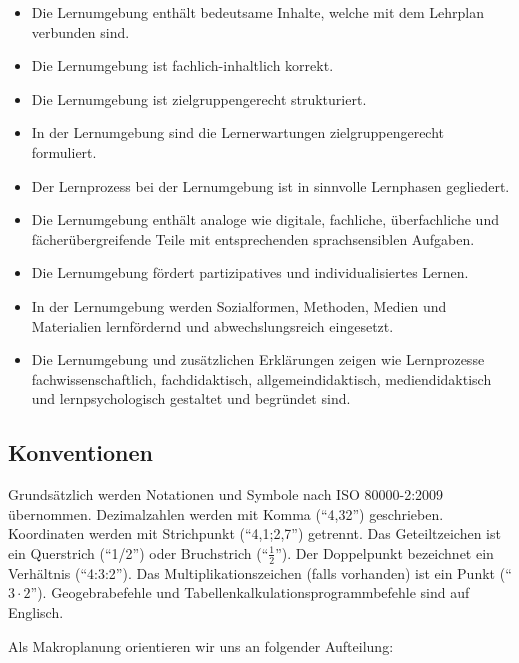 \documentclass[
  10pt,
  a4paper,
  DIV=11,
  oneside]{scrartcl}
\providecommand{\tightlist}{%
  \setlength{\itemsep}{0pt}\setlength{\parskip}{0pt}}\usepackage{longtable,booktabs,array}
\begin{document}
\begin{itemize}
\tightlist
\item
  Die Lernumgebung enthält bedeutsame Inhalte, welche mit dem Lehrplan
  verbunden sind.
\item
  Die Lernumgebung ist fachlich-inhaltlich korrekt.
\item
  Die Lernumgebung ist zielgruppengerecht strukturiert.\\
\item
  In der Lernumgebung sind die Lernerwartungen zielgruppengerecht
  formuliert.
\item
  Der Lernprozess bei der Lernumgebung ist in sinnvolle Lernphasen
  gegliedert.
\item
  Die Lernumgebung enthält analoge wie digitale, fachliche,
  überfachliche und fächerübergreifende Teile mit entsprechenden
  sprachsensiblen Aufgaben.
\item
  Die Lernumgebung fördert partizipatives und individualisiertes Lernen.
\item
  In der Lernumgebung werden Sozialformen, Methoden, Medien und
  Materialien lernfördernd und abwechslungsreich eingesetzt.
\item
  Die Lernumgebung und zusätzlichen Erklärungen zeigen wie Lernprozesse
  fachwissenschaftlich, fachdidaktisch, allgemeindidaktisch,
  mediendidaktisch und lernpsychologisch gestaltet und begründet sind.
\end{itemize}

\subsection{Konventionen}\label{konventionen}

Grundsätzlich werden Notationen und Symbole nach ISO 80000-2:2009
übernommen. Dezimalzahlen werden mit Komma (``4,32'') geschrieben.
Koordinaten werden mit Strichpunkt (``4,1;2,7'') getrennt. Das
Geteiltzeichen ist ein Querstrich (``1/2'') oder Bruchstrich
(``\(\frac{1}{2}\)''). Der Doppelpunkt bezeichnet ein Verhältnis
(``4:3:2''). Das Multiplikationszeichen (falls vorhanden) ist ein Punkt
(``\(3\cdot 2\)''). Geogebrabefehle und
Tabellenkalkulationsprogrammbefehle sind auf Englisch.

Als Makroplanung orientieren wir uns an folgender Aufteilung:
\end{document}
